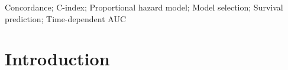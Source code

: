 \documentclass[useAMS,usenatbib, referee]{biom}
\begin{document}
%

\begin{keywords}
Concordance; C-index; Proportional hazard model; Model selection; Survival prediction; Time-dependent AUC
\end{keywords}


\maketitle


%

\section{Introduction}
\label{s:intro}
\end{document}
